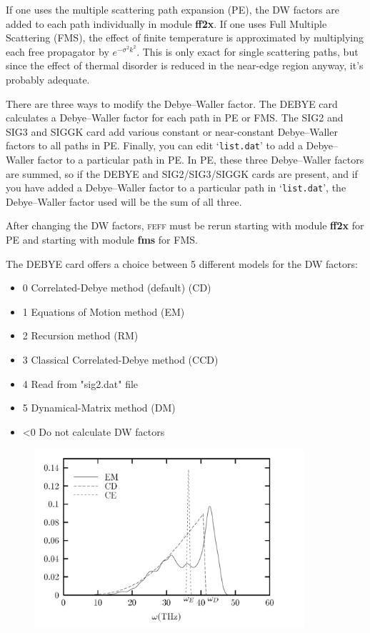 \documentclass[11pt,oneside]{report} %
\renewcommand{\htmlref}[2]{\hyperlink{#2}{#1}}
\newcommand{\program}[1]{\textsc{#1}}
\newcommand{\feff}{\program{feff}}
\newcommand{\file}[1]{`\texttt{#1}'}
\newcommand{\module}[1]{\textrm{\bf{#1}}}
\renewcommand{\htmlref}[2]{{#1}} %
\begin{document}
If one uses the multiple scattering path expansion (PE), the DW factors are added
to each path individually in module \module{ff2x}.  If one uses Full Multiple Scattering (FMS), the effect of finite temperature is approximated by multiplying each free propagator by $e^{-\sigma^{2}k^{2}}$.  This is only exact for single scattering paths, but since the effect of thermal disorder is reduced in the near-edge region anyway, it's probably adequate.

There are three ways to modify the Debye--Waller factor. The \htmlref{DEBYE}{card:deb2} card
calculates a Debye--Waller factor for each path in PE or FMS. The \htmlref{SIG2}{card:sig} and SIG3 and SIGGK card add
various constant or near-constant Debye--Waller factors to all paths in PE. Finally, you can edit \file{list.dat}
to add a Debye--Waller factor to a particular path in PE. In PE, these three
Debye--Waller factors are summed, so if the DEBYE and SIG2/SIG3/SIGGK cards are present,
and if you have added a Debye--Waller factor to a particular path in \file{list.dat}, the Debye--Waller factor 
used will be the sum of all three.  

After changing the DW factors, {\feff} must be rerun starting with module \module{ff2x} for PE and starting with module \module{fms} for FMS.

The \htmlref{DEBYE}{car:deb2} card offers a choice between 5 different models for the DW factors:
\begin{itemize}
				\item  0	Correlated-Debye method  (default) (CD)
				\item  1	Equations of Motion method (EM)
				\item  2	Recursion method (RM)
				\item  3	Classical Correlated-Debye method (CCD)
				\item  4	Read from "sig2.dat" file
				\item  5	Dynamical-Matrix method (DM)
				\item <0	Do not calculate DW factors
\end{itemize}

\begin{figure}[H]
	\centering
		\includegraphics[height=2.6in]{annafig2.pdf}
	\label{fig:DWAnnaCompares}
\end{figure}
\end{document}
